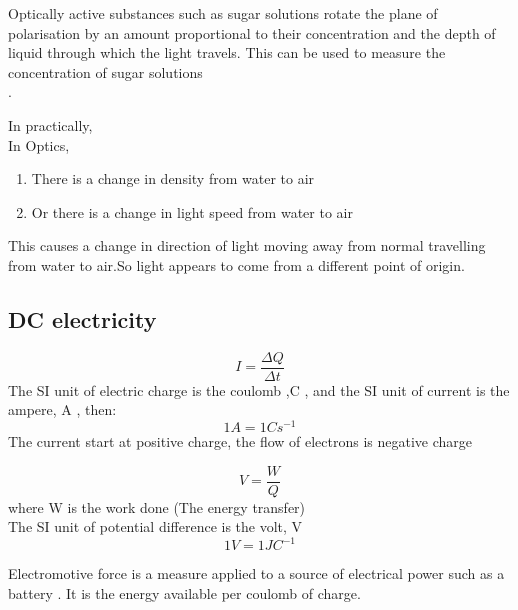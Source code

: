 \documentclass[a4paper]{article}
\begin{document}
\begin{defi}
Optically active substances such as sugar solutions rotate the plane of polarisation by an amount proportional to their concentration and the depth of liquid through which the light travels. This can be used to measure the concentration of sugar solutions\\.

In practically,\\
In Optics,
\begin{enumerate}
    \item There is a change in density from water to air
    \item Or there is a change in light speed from water to air
    
\end{enumerate}
This causes a change in direction of light moving away from normal travelling from water to air.So light appears to come from a different point of origin.
\end{defi}




\subsection{DC electricity}
\begin{defi}[Current]
\begin{equation*}
    I=\frac{\Delta Q}{\Delta t}
\end{equation*}
The SI unit of electric charge is the coulomb ,C , and the SI unit of current is the ampere, A , then:
\begin{equation*}
    1 A= 1Cs^{-1}
\end{equation*}
The current start at positive charge, the flow of electrons is negative charge
\end{defi}
\begin{defi}
\begin{equation*}
    V=\frac{W}{Q}
\end{equation*}
where W is the work done (The energy transfer)\\

The SI unit of potential difference is the volt, V
\begin{equation*}
    1 V=1JC^{-1}
\end{equation*}
\end{defi}

\begin{defi}[Emf]
Electromotive force is a measure applied to a source of electrical power such as a battery . It is the energy available per coulomb of charge.
\end{defi}
\end{document}
